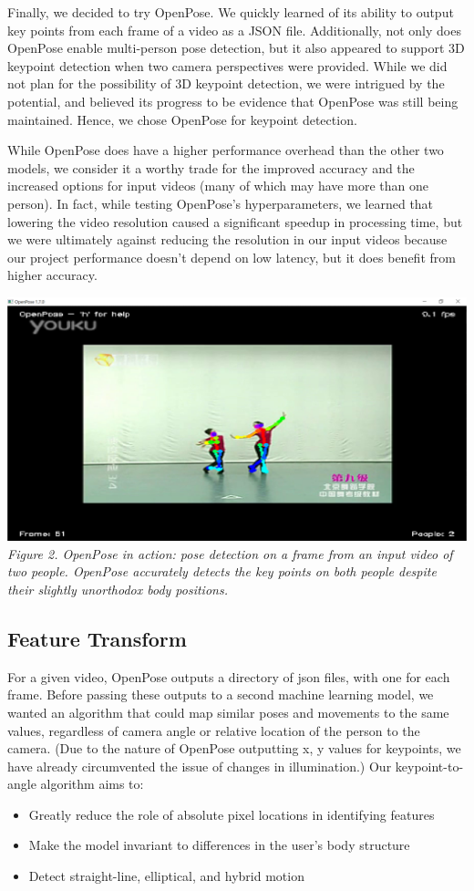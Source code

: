 \indent Finally, we decided to try OpenPose. We quickly learned of its ability to output key points from each frame of a 
video as a JSON file. Additionally, not only does OpenPose enable multi-person pose detection, but it also appeared 
to support 3D keypoint detection when two camera perspectives were provided. While we did not plan for the possibility 
of 3D keypoint detection, we were intrigued by the potential, and believed its progress to be evidence that OpenPose 
was still being maintained. Hence, we chose OpenPose for keypoint detection.
	
\indent While OpenPose does have a higher performance overhead than the other two models, we consider it a worthy trade for the 
improved accuracy and the increased options for input videos (many of which may have more than one person). In fact, while 
testing OpenPose’s hyperparameters, we learned that lowering the video resolution caused a significant speedup in 
processing time, but we were ultimately against reducing the resolution in our input videos because our project 
performance doesn’t depend on low latency, but it does benefit from higher accuracy.

\includegraphics[width=\columnwidth]{sec/openpose_demo}
\textit{Figure 2. OpenPose in action: pose detection on a frame from an input video of two people. 
OpenPose accurately detects the key points on both people despite their slightly unorthodox body positions.}

\subsection{Feature Transform}
\indent For a given video, OpenPose outputs a directory of json files, with one for each frame. Before passing these outputs to a 
second machine learning model, we wanted an algorithm that could map similar poses and movements to the same values, 
regardless of camera angle or relative location of the person to the camera. (Due to the nature of OpenPose outputting x, 
y values for keypoints, we have already circumvented the issue of changes in illumination.)  Our keypoint-to-angle algorithm 
aims to:
\begin{itemize}
    \item Greatly reduce the role of absolute pixel locations in identifying features
    \item Make the model invariant to differences in the user’s body structure
    \item Detect straight-line, elliptical, and hybrid motion
\end{itemize}

